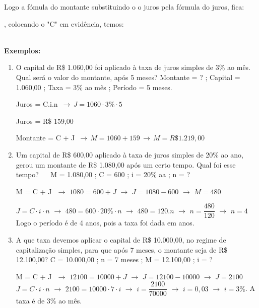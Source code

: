 \begin{multicols*}{2}
	Logo a fómula do montante substituindo o o juros pela fórmula do juros, fica:

	\textbf{}, colocando o "C" em evidência, temos:

	\textbf{}\\

	\textbf{Exemplos:}

	\begin{enumerate}
		\item O capital de R\$ 1.060,00 foi aplicado à taxa de juros simples de 3\% ao mês. Qual será o valor do montante, após 5 meses?		Montante = ?  ;  Capital = 1.060,00  ;  Taxa = 3\% ao mês  ;  Período = 5 meses.

		      Juros = C.i.n  $\, \rightarrow \,  J = 1060 \cdot 3\% \cdot 5$

		      Juros = R\$ 159,00

		      Montante = C + J $ \, \rightarrow \, M = 1060 + 159 \, \rightarrow \, M = R\$1.219,00$

		\item Um capital de R\$ 600,00 aplicado à taxa de juros simples de 20\% ao ano, gerou  um  montante  de R\$ 1.080,00 após um certo tempo. Qual foi esse tempo?  $\, \, \, \, \, \, $  M = 1.080,00 ; C = 600 ; i = 20\% aa ; n = ?

		      M = C + J $\, \, \rightarrow \, \,  1080 = 600 + J \, \, \rightarrow \, \, J = 1080 - 600 \, \, \rightarrow \, \, M= 480$

		      $ J = C\cdot i \cdot n \, \, \rightarrow \, \, 480 = 600 \cdot 20\% \cdot n \, \, \rightarrow \, \, 480 = 120.n \, \, \rightarrow \, \, n = \dfrac{480}{120}\, \, \rightarrow \, \, n = 4 $ Logo o período é de 4 anos, pois a taxa foi dada em anos.

		\item A que taxa devemos aplicar o capital de R\$ 10.000,00, no regime de capitalização simples, para que após 7 meses, o montante seja de R\$ 12.100,00?  C = 10.000,00  ;  n = 7 meses  ;  M = 12.100,00 ;  i = ?

		      M = C + J $\, \, \rightarrow \, \, 12100 = 10000 + J \, \, \rightarrow \, \, J = 12100 - 10000 \, \, \rightarrow \, \, J = 2100$\\

		      $ J = C \cdot i \cdot n \, \, \rightarrow \, \,2100 = 10000 \cdot 7 \cdot i \, \, \rightarrow \, \, i = \dfrac{2100}{70000} \, \, \rightarrow \, \, i = 0,03 \, \, \rightarrow \, \, i = 3\% $. A taxa é de 3\% ao mês.


\end{enumerate}
\end{multicols*}
